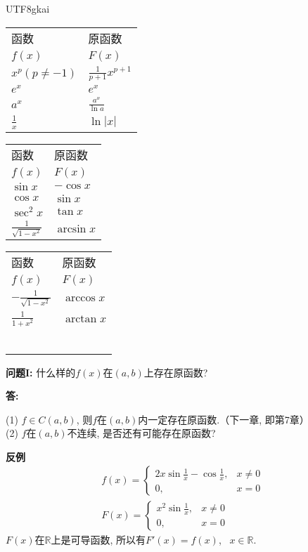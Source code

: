 \documentclass{article}
\begin{document}
\begin{CJK*}{UTF8}{gkai}
\begin{table*}[h]
	\caption*{原函数表}
	\centering
	\begin{tabular}{ l l }
		函数			&	原函数 \\
		$f(x)$			&	$F(x)$ \\
		$x^p(p\ne-1)$	&	$\frac{1}{p+1} x^{p+1}$ \\
		$e^x$			&	$e^x$ \\
		$a^x$			&	$\frac{a^x}{\ln a}$ \\
		$\frac{1}{x}$	&	$\ln |x|$
	\end{tabular}
	\begin{tabular}{ l l }
		函数						&	原函数 \\
		$f(x)$						&	$F(x)$ \\
		$\sin x$					&	$-\cos x$ \\
		$\cos x$					&	$\sin x$ \\
		$\sec^2 x$					&	$\tan x$ \\
		$\frac{1}{\sqrt{1-x^2}}$	&	$\arcsin x$
	\end{tabular}
	\begin{tabular}{ l l }
		函数						&	原函数 \\
		$f(x)$						&	$F(x)$ \\
		$-\frac{1}{\sqrt{1-x^2}}$	&	$\arccos x$ \\
		$\frac{1}{1+x^2}$			&	$\arctan x$ \\ \\ \ 
	\end{tabular}
\end{table*}

\textbf{问题I: }什么样的$f(x)$在$(a,b)$上存在原函数?

\textbf{答: }\parbox[t]{5in}{
(1) $ f \in C(a,b) $, 则$ f $在$(a,b)$内一定存在原函数.（下一章, 即第7章）\\
(2) $f$在$(a,b)$不连续, 是否还有可能存在原函数?}

\textbf{反例}
\begin{gather*}
	f(x) =
	\begin{cases}
		2x \sin \frac{1}{x} - \cos \frac{1}{x}, & x \ne 0 \\
		0, & x = 0
	\end{cases} \label{E:counterExample} \tag{反例}\\
	F(x) =
	\begin{cases}
		x^2 \sin \frac{1}{x}, & x \ne 0 \\
		0, & x = 0
	\end{cases}
\end{gather*}
$F(x)$在$\mathbb{R}$上是可导函数, 所以有$F'(x) = f(x)$, \ $x \in \mathbb{R}$.


\end{CJK*}
\end{document}
